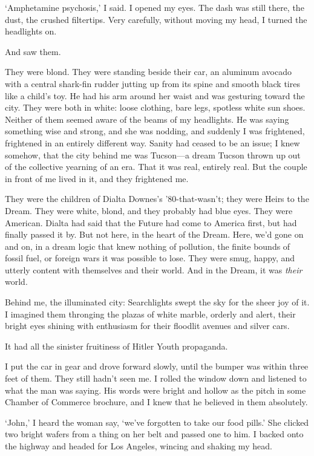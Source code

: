 `Amphetamine psychosis,' I said. I opened my eyes. The dash was still there, the dust, the crushed filtertips. Very carefully, without moving my head, I turned the headlights on.

And saw them.

They were blond. They were standing beside their car, an aluminum avocado with a central shark-fin rudder jutting up from its spine and smooth black tires like a child's toy. He had his arm around her waist and was gesturing toward the city. They were both in white: loose clothing, bare legs, spotless white sun shoes. Neither of them seemed aware of the beams of my headlights. He was saying something wise and strong, and she was nodding, and suddenly I was frightened, frightened in an entirely different way. Sanity had ceased to be an issue; I knew somehow, that the city behind me was Tucson---a dream Tucson thrown up out of the collective yearning of an era. That it was real, entirely real. But the couple in front of me lived in it, and they frightened me.

They were the children of Dialta Downes's '80-that-wasn't; they were Heirs to the Dream. They were white, blond, and they probably had blue eyes. They were American. Dialta had said that the Future had come to America first, but had finally passed it by. But not here, in the heart of the Dream. Here, we'd gone on and on, in a dream logic that knew nothing of pollution, the finite bounds of fossil fuel, or foreign wars it was possible to lose. They were smug, happy, and utterly content with themselves and their world. And in the Dream, it was \textit{their} world.

Behind me, the illuminated city: Searchlights swept the sky for the sheer joy of it. I imagined them thronging the plazas of white marble, orderly and alert, their bright eyes shining with enthusiasm for their floodlit avenues and silver cars.

It had all the sinister fruitiness of Hitler Youth propaganda.

I put the car in gear and drove forward slowly, until the bumper was within three feet of them. They still hadn't seen me. I rolled the window down and listened to what the man was saying. His words were bright and hollow as the pitch in some Chamber of Commerce brochure, and I knew that he believed in them absolutely.

`John,' I heard the woman say, `we've forgotten to take our food pills.' She clicked two bright wafers from a thing on her belt and passed one to him. I backed onto the highway and headed for Los Angeles, wincing and shaking my head.


